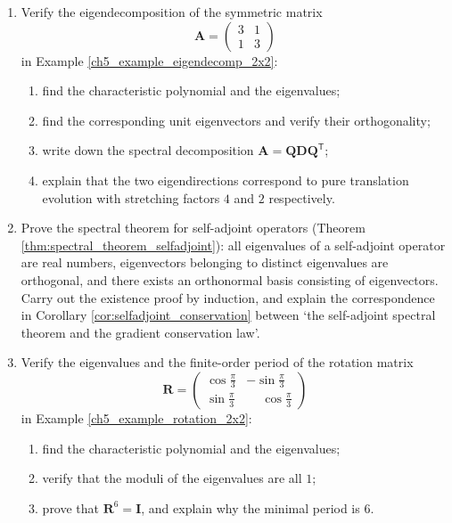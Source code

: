 \begin{enumerate}[leftmargin=3em, label=\textbf{Exercise \arabic*}]
    \item Verify the eigendecomposition of the symmetric matrix
    \[
    \mathbf{A}=\begin{pmatrix}3&1\\1&3\end{pmatrix}
    \]
    in Example \ref{ch5_example_eigendecomp_2x2}:
    \begin{enumerate}[label=(\roman*)]
        \item find the characteristic polynomial and the eigenvalues;
        \item find the corresponding unit eigenvectors and verify their orthogonality;
        \item write down the spectral decomposition $\mathbf{A}=\mathbf{Q}\mathbf{D}\mathbf{Q}^{\mathsf T}$;
        \item explain that the two eigendirections correspond to pure translation evolution with stretching factors $4$ and $2$ respectively.
    \end{enumerate}

    \item Prove the spectral theorem for self-adjoint operators (Theorem \ref{thm:spectral_theorem_selfadjoint}):
    all eigenvalues of a self-adjoint operator are real numbers, eigenvectors belonging to distinct eigenvalues are orthogonal,
    and there exists an orthonormal basis consisting of eigenvectors.
    Carry out the existence proof by induction, and explain the correspondence in Corollary \ref{cor:selfadjoint_conservation}
    between `the self-adjoint spectral theorem and the gradient conservation law'.

    \item Verify the eigenvalues and the finite-order period of the rotation matrix
    \[
    \mathbf{R}=\begin{pmatrix}
    \cos\frac{\pi}{3}&-\sin\frac{\pi}{3}\\[2pt]
    \sin\frac{\pi}{3}&\phantom{-}\cos\frac{\pi}{3}
    \end{pmatrix}
    \]
    in Example \ref{ch5_example_rotation_2x2}:
    \begin{enumerate}[label=(\roman*)]
        \item find the characteristic polynomial and the eigenvalues;
        \item verify that the moduli of the eigenvalues are all $1$;
        \item prove that $\mathbf{R}^6=\mathbf{I}$, and explain why the minimal period is $6$.
    \end{enumerate}


\end{enumerate}
